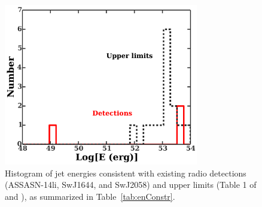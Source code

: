\documentclass[usenatbib,fleqn]{mnras}
\begin{document}
\begin{figure}
\includegraphics[width=8.5cm]{hist.pdf}
\caption{\label{fig:hist} Histogram of jet energies consistent with
  existing radio detections (ASSASN-14li,  SwJ1644, and
  SwJ2058) and upper limits (Table 1 of \citealt{Mimica+2015} and
  \citealt{Arcavi+2014}), as summarized in Table~\ref{tab:enConstr}.}
\end{figure}
\end{document}
